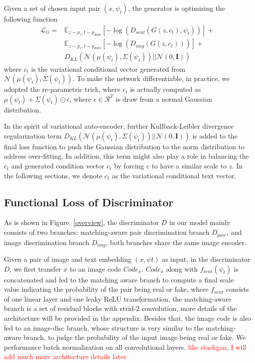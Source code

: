 \documentclass[10pt,twocolumn,letterpaper]{article}
\begin{document}
Given a set of chosen input pair $(x, \psi_t)$, the generator is optimizing the following function
 \begin{equation}
 \label{genloss}
 \begin{split}
 \mathcal{L}_G = & \mathbb{E}_{z\sim p_{z}, t \sim p_{data}}[-\log( D_{sent}( G(z, c_t),  \psi_t) ) ] + \\
				  & \mathbb{E}_{z\sim p_{z}, t \sim p_{data}}[-\log( D_{img}( G(z, c_t) ) ) ] + \\
                  & D_{KL}(\mathcal{N}(\mu(\psi_t), \Sigma(\psi_t) )|| \mathcal{N}(0, \bm{I})) 		   
 \end{split}
 \end{equation}
 where $c_t$ is the variational conditional vector generated from $\mathcal{N}(\mu(\psi_t), \Sigma(\psi_t) )$. To make the network differentiable, in practice, we adopted the re-parametric trick\cite{vae}, where $c_t$ is actually computed as $\mu(\psi_t)+\Sigma(\psi_t)\odot \epsilon$, where $\epsilon\in \mathcal{R}^{T}$ is draw from a normal Gaussian distribution.  
 
 In the spirit of variational auto-encoder, further Kullback-Leibler divergence regularization term  $D_{KL}(\mathcal{N}(\mu(\psi_t), \Sigma(\psi_t) )|| \mathcal{N}(0, \bm{I}))$ is added to the final loss function to push the Gaussian distribution to the norm distribution to address over-fitting.  In addition, this term might also play a role in balancing the $c_t$ and generated condition vector $c_t$ by forcing $c$ to have a similar scale to $z$.  In the following sections, we denote $c_t$ as the variational conditional text vector.
 
 
\subsection{Functional Loss of Discriminator}

As is shown in Figure. \ref{overview}, the discriminator $D$ in our model mainly consists of two branches: matching-aware pair discrimination branch $D_{pair}$, and image discrimination branch $D_{img}$, both branches share the same  image encoder.

Given a pair of image and text embedding $(x, \psi{t})$ as input, in the discriminator $D$, we first transfer $x$  to an image code $Code_x$. $Code_x$ along with $f_{sent}(\psi_t)$ is concatenated and fed to the matching aware branch to compute a final scale value indicating the probability of the pair being real or fake, where $f_{sent}$ consists of one linear layer and one leaky ReLU transformation,  the matching-aware branch is a set of residual blocks with strid-2 convolution, more details of the architecture will be provided in the appendix. Besides that, the image code is also fed to an image-disc branch, whose structure is very similar to the matching-aware branch, to judge the probability of the input image being real or fake. We performance batch normalization on all convolutional layers. \textcolor{red}{like stackgan, I will add much more architecture details later}  
\end{document}
